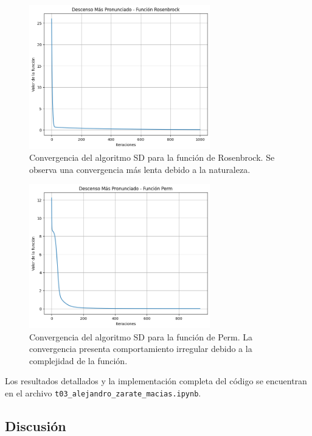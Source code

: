 \documentclass{article}
\begin{document}
\begin{figure}[H]
\centering
\includegraphics[width=0.7\textwidth]{images/6_rosenbrock.png}
\caption{Convergencia del algoritmo SD para la función de Rosenbrock. Se observa una convergencia más lenta debido a la naturaleza.}
\label{fig:sd_rosenbrock}
\end{figure}

\begin{figure}[H]
\centering
\includegraphics[width=0.7\textwidth]{images/6_perm.png}
\caption{Convergencia del algoritmo SD para la función de Perm. La convergencia presenta comportamiento irregular debido a la complejidad de la función.}
\label{fig:sd_perm}
\end{figure}

Los resultados detallados y la implementación completa del código se encuentran en el archivo \texttt{t03\_alejandro\_zarate\_macias.ipynb}.

\subsection{Discusión}
\end{document}
